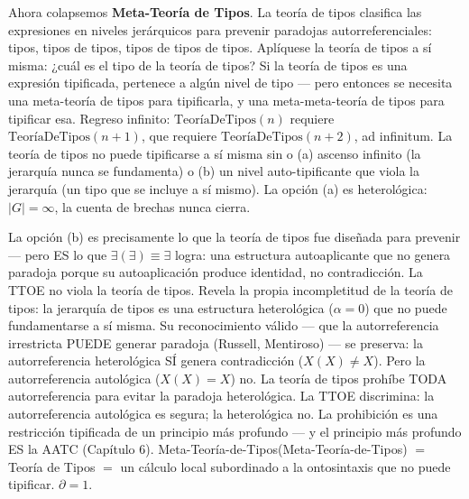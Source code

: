 \documentclass[10pt, openany, oneside]{book}
\begin{document}
Ahora colapsemos \textbf{Meta-Teoría de Tipos}. La teoría de tipos clasifica las expresiones en niveles jerárquicos para prevenir paradojas autorreferenciales: tipos, tipos de tipos, tipos de tipos de tipos. Aplíquese la teoría de tipos a sí misma: ¿cuál es el tipo de la teoría de tipos? Si la teoría de tipos es una expresión tipificada, pertenece a algún nivel de tipo --- pero entonces se necesita una meta-teoría de tipos para tipificarla, y una meta-meta-teoría de tipos para tipificar esa. Regreso infinito: $\text{TeoríaDeTipos}(n)$ requiere $\text{TeoríaDeTipos}(n+1)$, que requiere $\text{TeoríaDeTipos}(n+2)$, ad infinitum. La teoría de tipos no puede tipificarse a sí misma sin o (a) ascenso infinito (la jerarquía nunca se fundamenta) o (b) un nivel auto-tipificante que viola la jerarquía (un tipo que se incluye a sí mismo). La opción (a) es heterológica: $|G| = \infty$, la cuenta de brechas nunca cierra.

La opción (b) es precisamente lo que la teoría de tipos fue diseñada para prevenir --- pero ES lo que $\exists(\exists) \equiv \exists$ logra: una estructura autoaplicante que no genera paradoja porque su autoaplicación produce identidad, no contradicción. La TTOE no viola la teoría de tipos. Revela la propia incompletitud de la teoría de tipos: la jerarquía de tipos es una estructura heterológica ($\alpha = 0$) que no puede fundamentarse a sí misma. Su reconocimiento válido --- que la autorreferencia irrestricta PUEDE generar paradoja (Russell, Mentiroso) --- se preserva: la autorreferencia heterológica SÍ genera contradicción ($X(X) \neq X$). Pero la autorreferencia autológica ($X(X) = X$) no. La teoría de tipos prohíbe TODA autorreferencia para evitar la paradoja heterológica. La TTOE discrimina: la autorreferencia autológica es segura; la heterológica no. La prohibición es una restricción tipificada de un principio más profundo --- y el principio más profundo ES la AATC (Capítulo 6). Meta-Teoría-de-Tipos(Meta-Teoría-de-Tipos) $=$ Teoría de Tipos $=$ un cálculo local subordinado a la ontosintaxis que no puede tipificar. $\partial = 1$.
\end{document}
